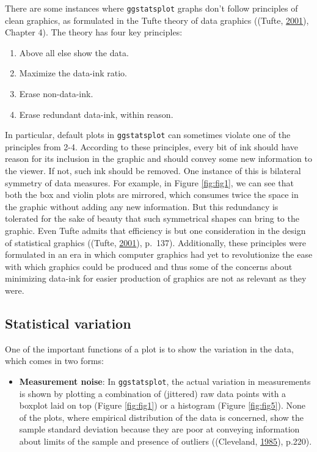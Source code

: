\documentclass[
]{article}
\providecommand{\tightlist}{%
  \setlength{\itemsep}{0pt}\setlength{\parskip}{0pt}}
\begin{document}
There are some instances where \texttt{ggstatsplot} graphs don't follow principles of
clean graphics, as formulated in the Tufte theory of data graphics
((Tufte, \protect\hyperlink{ref-tufteVisualDisplayQuantitative2001}{2001}), Chapter 4). The theory has four key
principles:

\begin{enumerate}
\def\labelenumi{\arabic{enumi}.}
\tightlist
\item
  Above all else show the data.
\item
  Maximize the data-ink ratio.
\item
  Erase non-data-ink.
\item
  Erase redundant data-ink, within reason.
\end{enumerate}

In particular, default plots in \texttt{ggstatsplot} can sometimes violate one of the
principles from 2-4. According to these principles, every bit of ink should have
reason for its inclusion in the graphic and should convey some new information
to the viewer. If not, such ink should be removed. One instance of this is
bilateral symmetry of data measures. For example, in Figure \ref{fig:fig1}, we
can see that both the box and violin plots are mirrored, which consumes twice
the space in the graphic without adding any new information. But this redundancy
is tolerated for the sake of beauty that such symmetrical shapes can bring to
the graphic. Even Tufte admits that efficiency is but one consideration in the
design of statistical graphics ((Tufte, \protect\hyperlink{ref-tufteVisualDisplayQuantitative2001}{2001}),
p.~137). Additionally, these principles were formulated in an era in which
computer graphics had yet to revolutionize the ease with which graphics could be
produced and thus some of the concerns about minimizing data-ink for easier
production of graphics are not as relevant as they were.

\hypertarget{statistical-variation}{%
\subsection{Statistical variation}\label{statistical-variation}}

One of the important functions of a plot is to show the variation in the data,
which comes in two forms:

\begin{itemize}
\tightlist
\item
  \textbf{Measurement noise}: In \texttt{ggstatsplot}, the actual variation in
  measurements is shown by plotting a combination of (jittered) raw data
  points with a boxplot laid on top (Figure \ref{fig:fig1}) or a histogram
  (Figure \ref{fig:fig5}). None of the plots, where empirical distribution of
  the data is concerned, show the sample standard deviation because they are
  poor at conveying information about limits of the sample and presence of
  outliers ((Cleveland, \protect\hyperlink{ref-clevelandElementsGraphingData1985}{1985}), p.220).
\end{itemize}
\end{document}
